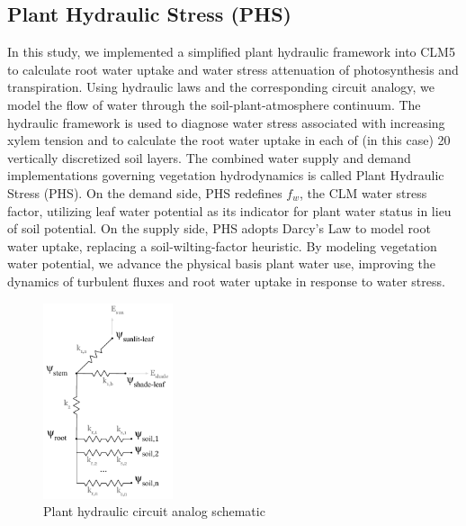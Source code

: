 \documentclass[draft,linenumbers]{agujournal}
\begin{document}
\subsection{Plant Hydraulic Stress (PHS)}
  In this study, we implemented a simplified plant hydraulic framework into CLM5 to calculate root water uptake and water stress attenuation of photosynthesis and transpiration.
  Using hydraulic laws and the corresponding circuit analogy, we model the flow of water through the soil-plant-atmosphere continuum. 
  The hydraulic framework is used to diagnose water stress associated with increasing xylem tension
  and to calculate the root water uptake in each of (in this case) 20 vertically discretized soil layers.
  The combined water supply and demand implementations governing vegetation hydrodynamics is called Plant Hydraulic Stress (PHS).
  On the demand side, PHS redefines $f_w$, the CLM water stress factor, utilizing leaf water potential as its indicator for plant water status in lieu of soil potential.
  On the supply side, PHS adopts Darcy's Law to model root water uptake, replacing a soil-wilting-factor heuristic.
  By modeling vegetation water potential, we advance the physical basis plant water use, 
  improving the dynamics of turbulent fluxes and root water uptake in response to water stress. 

  \begin{figure}[h]
     \centering
     \includegraphics[width=9pc]{../figs/circuit.pdf}
     \caption{Plant hydraulic circuit analog schematic}
     \label{circuit}
  \end{figure}
\end{document}
